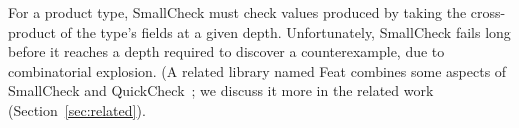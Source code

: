 \documentclass{sigplanconf}
\newcommand{\ttp}[1]{\texttt{#1}}
\begin{document}
For a product type, SmallCheck must check values produced by taking the
cross-product of the type's fields at a given depth.  Unfortunately, SmallCheck
fails long before it reaches a depth required to discover a counterexample, due
to combinatorial explosion.  (A related library named Feat combines some aspects
of SmallCheck and QuickCheck~\cite{feat}; we discuss it more in the related work
(Section~\ref{sec:related}).





\end{document}
